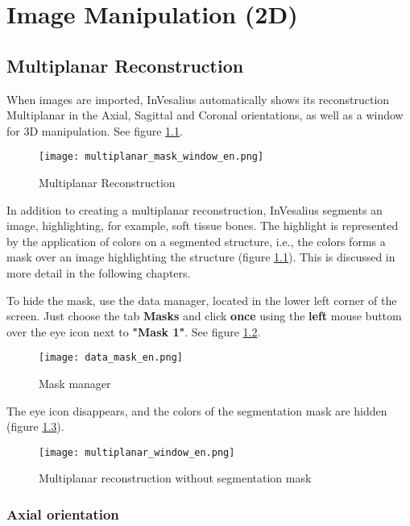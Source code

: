 \chapter{Image Manipulation (2D)}

\section{Multiplanar Reconstruction}

When images are imported, InVesalius automatically shows its reconstruction
Multiplanar in the Axial, Sagittal and Coronal orientations, as well as a window for 3D manipulation.
See figure \ref{fig:mpr}.

\begin{figure}[!htb]
\centering
\texttt{[image: multiplanar\_mask\_window\_en.png]}
\caption{Multiplanar Reconstruction}
\label{fig:mpr}
\end{figure}

\newpage

In addition to creating a multiplanar reconstruction, InVesalius segments an image, highlighting, for example, soft tissue bones. The highlight is represented by the application of colors on a segmented structure, i.e., the colors forms a mask over an image highlighting the structure (figure \ref{fig:mpr}). This is discussed in more detail in the following chapters.


To hide the mask, use the data manager, located in the lower left corner
of the screen. Just choose the tab \textbf{Masks} and click \textbf{once} using the
\textbf{left} mouse buttom over the eye icon next to \textbf{"Mask 1"}. See figure
\ref{fig:ger_masc}.

\begin{figure}[!htb]
\centering
\texttt{[image: data\_mask\_en.png]}
\caption{Mask manager}
\label{fig:ger_masc}
\end{figure}

The eye icon disappears, and the colors of the segmentation mask are hidden (figure
\ref{fig:mpr_sem_mask}).

\begin{figure}[!htb]
\centering
\texttt{[image: multiplanar\_window\_en.png]}
\caption{Multiplanar reconstruction without segmentation mask}
\label{fig:mpr_sem_mask}
\end{figure}

\subsection{Axial orientation}

